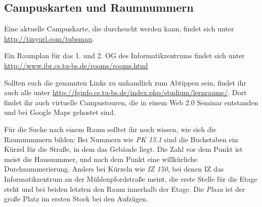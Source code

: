 \subsection{Campuskarten und Raumnummern}
\label{campuskarte}
Eine aktuelle Campuskarte, die durchsucht werden kann, findet sich unter \url{http://tinyurl.com/tubsmap}.

Ein Raumplan für das 1. und 2. OG des Informatikzentrums findet sich
unter \url{http://www.ibr.cs.tu-bs.de/rooms/rooms.html}

Sollten euch die genannten Links zu unhandlich zum Abtippen sein, findet ihr
auch alle unter \url{http://fginfo.cs.tu-bs.de/index.php/studium/lernraume/}.
Dort findet ihr auch virtuelle Campustouren, die  in einem Web 2.0 Seminar entstanden und
bei Google Maps gehostet sind.

Für die Suche nach einem Raum solltet ihr noch wissen, wie sich die Raumnummern bilden: Bei Nummern wie \textit{PK 15.1} sind die Buchstaben ein Kürzel für die Straße, in dem das Gebäude liegt. Die Zahl vor dem Punkt ist meist die Hausnummer, und nach dem Punkt eine willkürliche Durchnummerierung. Anders bei Kürzeln wie \textit{IZ 150}, bei denen IZ das Informatikzentrum an der Mühlenpfordstraße meint, die erste Stelle für die Etage steht und bei beiden letzten den Raum innerhalb der Etage. Die \textit{Plaza} ist der große Platz im ersten Stock bei den Aufzügen.